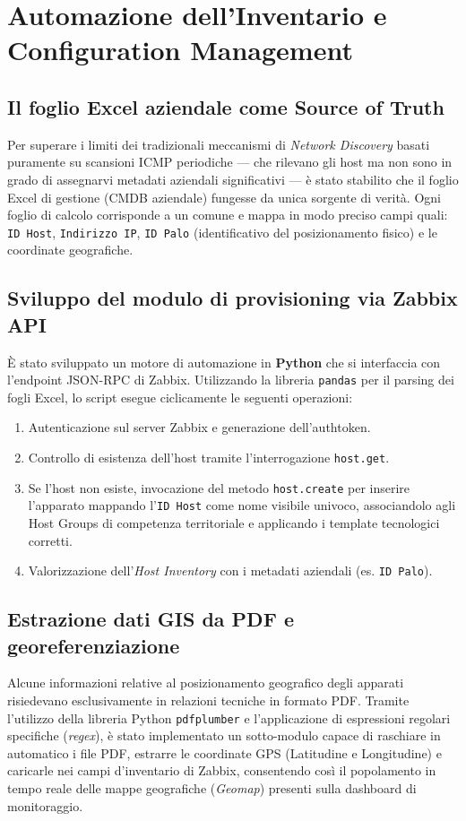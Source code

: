 \documentclass[12pt, a4paper]{report}
\begin{document}
\clearpage

\chapter{Automazione dell'Inventario e Configuration Management}
\section{Il foglio Excel aziendale come Source of Truth}
Per superare i limiti dei tradizionali meccanismi di \textit{Network Discovery} basati puramente su scansioni ICMP periodiche --- che rilevano gli host ma non sono in grado di assegnarvi metadati aziendali significativi --- \`e stato stabilito che il foglio Excel di gestione (CMDB aziendale) fungesse da unica sorgente di verit\`a. Ogni foglio di calcolo corrisponde a un comune e mappa in modo preciso campi quali: \texttt{ID Host}, \texttt{Indirizzo IP}, \texttt{ID Palo} (identificativo del posizionamento fisico) e le coordinate geografiche.

\section{Sviluppo del modulo di provisioning via Zabbix API}
\`E stato sviluppato un motore di automazione in \textbf{Python} che si interfaccia con l'endpoint JSON-RPC di Zabbix. Utilizzando la libreria \texttt{pandas} per il parsing dei fogli Excel, lo script esegue ciclicamente le seguenti operazioni:
\begin{enumerate}
    \item Autenticazione sul server Zabbix e generazione dell'authtoken.
    \item Controllo di esistenza dell'host tramite l'interrogazione \texttt{host.get}.
    \item Se l'host non esiste, invocazione del metodo \texttt{host.create} per inserire l'apparato mappando l'\texttt{ID Host} come nome visibile univoco, associandolo agli Host Groups di competenza territoriale e applicando i template tecnologici corretti.
    \item Valorizzazione dell'\textit{Host Inventory} con i metadati aziendali (es. \texttt{ID Palo}).
\end{enumerate}

\section{Estrazione dati GIS da PDF e georeferenziazione}
Alcune informazioni relative al posizionamento geografico degli apparati risiedevano esclusivamente in relazioni tecniche in formato PDF. Tramite l'utilizzo della libreria Python \texttt{pdfplumber} e l'applicazione di espressioni regolari specifiche (\textit{regex}), \`e stato implementato un sotto-modulo capace di raschiare in automatico i file PDF, estrarre le coordinate GPS (Latitudine e Longitudine) e caricarle nei campi d'inventario di Zabbix, consentendo cos\`i il popolamento in tempo reale delle mappe geografiche (\textit{Geomap}) presenti sulla dashboard di monitoraggio.
\end{document}
